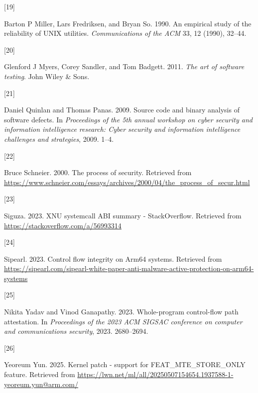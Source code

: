 \documentclass[a4paper, nobind]{templates/ociamthesis}
\newlength{\cslhangindent}
\newlength{\csllabelwidth}
\newenvironment{CSLReferences}[2] %
{\begin{list}{}{%
	\setlength{\itemindent}{0pt}
	\setlength{\leftmargin}{0pt}
	\setlength{\parsep}{0pt}
	\ifodd #1
	\setlength{\leftmargin}{\cslhangindent}
	\setlength{\itemindent}{-1\cslhangindent}
	\fi
	\setlength{\itemsep}{#2\baselineskip}}}
{\end{list}}
\newcommand{\CSLLeftMargin}[1]{\parbox[t]{\csllabelwidth}{\strut#1\strut}}
\newcommand{\CSLRightInline}[1]{\parbox[t]{\linewidth - \csllabelwidth}{\strut#1\strut}}
\begin{document}
\begin{CSLReferences}{0}{0}
\CSLLeftMargin{{[}19{]} }%
\CSLRightInline{Barton P Miller, Lars Fredriksen, and Bryan So. 1990. An empirical study of the reliability of UNIX utilities. \emph{Communications of the ACM} 33, 12 (1990), 32--44.}

\CSLLeftMargin{{[}20{]} }%
\CSLRightInline{Glenford J Myers, Corey Sandler, and Tom Badgett. 2011. \emph{The art of software testing}. John Wiley \& Sons.}

\CSLLeftMargin{{[}21{]} }%
\CSLRightInline{Daniel Quinlan and Thomas Panas. 2009. Source code and binary analysis of software defects. In \emph{Proceedings of the 5th annual workshop on cyber security and information intelligence research: Cyber security and information intelligence challenges and strategies}, 2009. 1--4.}

\CSLLeftMargin{{[}22{]} }%
\CSLRightInline{Bruce Schneier. 2000. The process of security. Retrieved from \url{https://www.schneier.com/essays/archives/2000/04/the_process_of_secur.html}}

\CSLLeftMargin{{[}23{]} }%
\CSLRightInline{Siguza. 2023. XNU systemcall ABI summary - StackOverflow. Retrieved from \url{https://stackoverflow.com/a/56993314}}

\CSLLeftMargin{{[}24{]} }%
\CSLRightInline{Sipearl. 2023. Control flow integrity on Arm64 systems. Retrieved from \url{https://sipearl.com/sipearl-white-paper-anti-malware-active-protection-on-arm64-systems}}

\CSLLeftMargin{{[}25{]} }%
\CSLRightInline{Nikita Yadav and Vinod Ganapathy. 2023. Whole-program control-flow path attestation. In \emph{Proceedings of the 2023 ACM SIGSAC conference on computer and communications security}, 2023. 2680--2694.}

\CSLLeftMargin{{[}26{]} }%
\CSLRightInline{Yeoreum Yun. 2025. Kernel patch - support for FEAT\_MTE\_STORE\_ONLY feature. Retrieved from \url{https://lwn.net/ml/all/20250507154654.1937588-1-yeoreum.yun@arm.com/}}

\end{CSLReferences}

\end{document}
